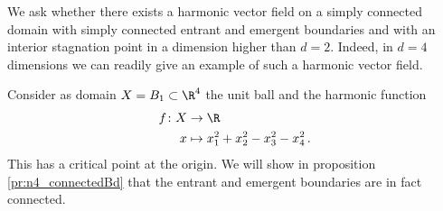 We ask whether there exists a harmonic vector field on a simply connected domain with simply connected entrant and emergent boundaries and with an interior stagnation point 
in a dimension higher than $d=2$. Indeed, in $d=4$ dimensions we can readily give an example
of such a harmonic vector field.
\begin{example}[Connected entrant boundary in $d=4$ dimensions]\label{ex:n4}
  Consider as domain $X=B_1\subset\R^4$ the unit ball and
  the harmonic function 
  \begin{equation}
    \begin{aligned}
    f\colon X&\to \R \\
    x &\mapsto x_1^2+x_2^2-x_3^2-x_4^2\,.
    \end{aligned}
    \label{eq:n4_deff}
  \end{equation}
  This has a critical point at the origin.
  We will show in proposition \ref{pr:n4_connectedBd} that the entrant and emergent boundaries are
  in fact connected.
\end{example}

